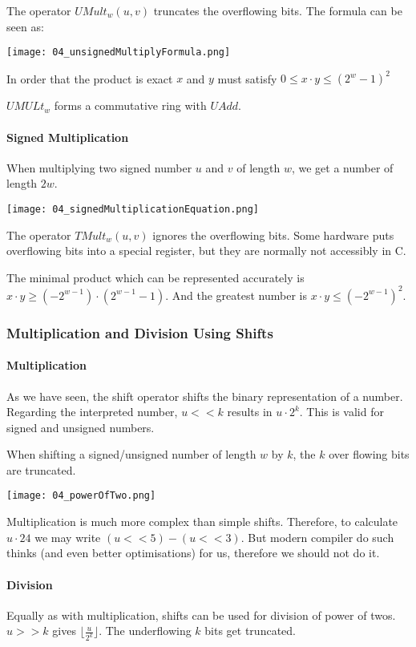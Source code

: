 The operator $UMult_w(u,v)$ truncates the overflowing bits. The formula can be seen as:

\texttt{[image: 04\_unsignedMultiplyFormula.png]}

In order that the product is exact $x$ and $y$ must satisfy $0 \le x \cdot y \le (2^w -1)^2$

$UMULt_w$ forms a commutative ring with $UAdd$.

\paragraph{Signed Multiplication}
When multiplying two signed number $u$ and $v$ of length $w$, we get a number of length $2w$.

\texttt{[image: 04\_signedMultiplicationEquation.png]}

The operator $TMult_w(u,v)$ ignores the overflowing bits. Some hardware puts overflowing bits into a special register, but they are normally not accessibly in C.

The minimal product which can be represented accurately is $x \cdot y \ge (-2^{w - 1}) \cdot (2^{w - 1} - 1)$. And the greatest number is $x \cdot y \le (-2^{w -1})^2$.

\subsubsection{Multiplication and Division Using Shifts}
\paragraph{Multiplication}
As we have seen, the shift operator shifts the binary representation of a number. Regarding the interpreted number, $u << k$ results in $u \cdot 2^k$. This is valid for signed and unsigned numbers.

When shifting a signed/unsigned number of length $w$ by $k$, the $k$ over flowing bits are truncated.

\texttt{[image: 04\_powerOfTwo.png]}

Multiplication is much more complex than simple shifts. Therefore, to calculate $u \cdot 24$ we may write $(u << 5) - (u << 3)$. But modern compiler do such thinks (and even better optimisations) for us, therefore we should not do it.

\paragraph{Division}
Equally as with multiplication, shifts can be used for division of power of twos. $u >> k$ gives $\lfloor \frac{u}{2^k} \rfloor$. The underflowing $k$ bits get truncated.

